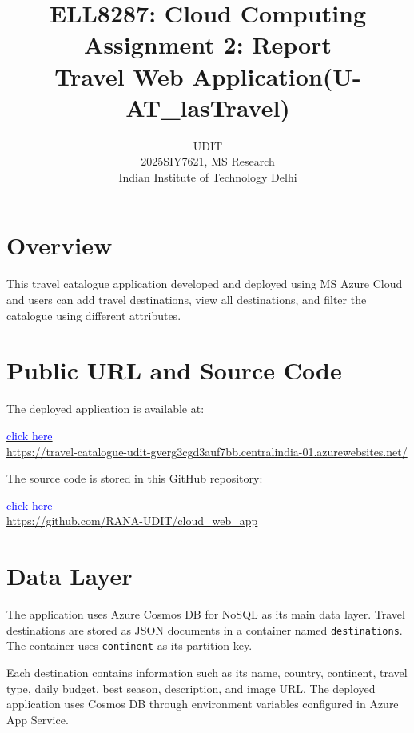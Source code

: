 \documentclass[12pt,a4paper]{article}
\title{ELL8287: Cloud Computing \\
Assignment 2: Report\\
Travel Web Application(U-AT\_lasTravel)}
\author{UDIT\\2025SIY7621, MS Research\\
Indian Institute of Technology Delhi}
\date{}
\begin{document}
\maketitle
\tableofcontents
\newpage

\section{Overview}

This travel catalogue application developed and deployed using MS Azure Cloud and users can add travel destinations, view all destinations, and filter the catalogue using different attributes.

\section{Public URL and Source Code}

The deployed application is available at:

\begin{center}
\href{https://travel-catalogue-udit-gverg3cgd3auf7bb.centralindia-01.azurewebsites.net/}
     {\textcolor{blue}{click here}}\\[0.5em]
\small\url{https://travel-catalogue-udit-gverg3cgd3auf7bb.centralindia-01.azurewebsites.net/}
\end{center}

The source code is stored in this GitHub repository:

\begin{center}
\href{https://github.com/RANA-UDIT/cloud_web_app}
     {\textcolor{blue}{click here}}\\[0.5em]
\small\url{https://github.com/RANA-UDIT/cloud_web_app}
\end{center}


\section{Data Layer}

The application uses Azure Cosmos DB for NoSQL as its main data layer. Travel destinations are stored as JSON documents in a container named \texttt{destinations}. The container uses \texttt{continent} as its partition key.

Each destination contains information such as its name, country, continent, travel type, daily budget, best season, description, and image URL. The deployed application uses Cosmos DB through environment variables configured in Azure App Service.
\end{document}
